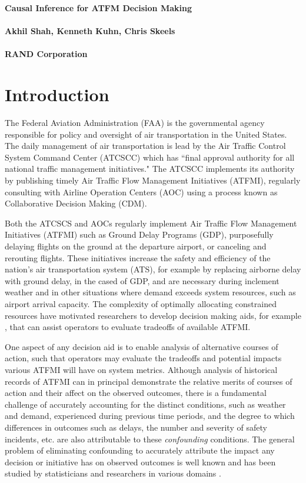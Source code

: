 \documentclass[11pt]{scrartcl}
\begin{document}
\noindent
{\bf \huge Causal Inference for ATFM Decision Making}\\
\ \\
{\bf \large Akhil Shah, Kenneth Kuhn, Chris Skeels}\\
\ \\
{\bf \normalsize RAND Corporation}\\
\section*{Introduction}
The Federal Aviation Administration (FAA) is the governmental agency responsible for policy and oversight of air transportation in the United States.  The daily management of air transportation is lead by the Air Traffic Control System Command Center (ATCSCC) which has ``final approval authority for all national traffic management initiatives."  The ATCSCC implements its authority by publishing timely Air Traffic Flow Management Initiatives (ATFMI), regularly consulting with Airline Operation Centers (AOC) using a process known as Collaborative Decision Making (CDM).   

Both the ATCSCS and AOCs regularly implement Air Traffic Flow Management Initiatives (ATFMI) such as Ground Delay Programs (GDP), purposefully delaying flights on the ground at the departure airport, or canceling and rerouting flights. These initiatives increase the safety and efficiency of the nation's air transportation system (ATS), for example by replacing airborne delay with ground delay, in the cased of GDP, and are necessary during inclement weather and in other situations where demand exceeds system resources, such as airport arrival capacity.  The complexity of optimally allocating constrained resources have motivated researchers to develop decision making aids, for example \cite{pyrgiotis2011public}, that can assist operators to evaluate tradeoffs of available ATFMI.

One aspect of any decision aid is to enable analysis of alternative courses of action, such that operators may evaluate the tradeoffs and potential impacts various ATFMI will have on system metrics.  Although analysis of historical records of ATFMI can in principal demonstrate the relative merits of courses of action and their affect on the observed outcomes, there is a fundamental challenge of accurately accounting for the distinct conditions, such as weather and demand, experienced during previous time periods, and the degree to which differences in outcomes such as delays, the number and severity of safety incidents, etc. are also attributable to these \emph{confounding} conditions.  The general problem of eliminating confounding to accurately attribute the impact any decision or initiative has on observed outcomes is well known and has been studied by statisticians and researchers in various domains \cite{rubin1974estimating}. 
\end{document}
